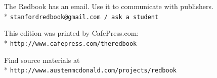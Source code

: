 \documentclass[10pt]{book}
\begin{document}
{\footnotesize
The Redbook has an email. Use it to communicate with publishers.\\*
\verb+stanfordredbook@gmail.com / ask a student+

This edition was printed by CafePress.com:\\*
\verb+http://www.cafepress.com/theredbook+

Find source materials at\\*
\verb+http://www.austenmcdonald.com/projects/redbook+}

\vfill\eject
\thispagestyle{empty}
\mbox{}
\vfill\eject
\thispagestyle{empty}
\mbox{}
\vfill\eject
\thispagestyle{empty}
\mbox{}
\vfill\eject
\thispagestyle{empty}
\mbox{}
\vfill\eject
\thispagestyle{empty}
\mbox{}
\vfill\eject
\thispagestyle{empty}
\mbox{}
\vfill\eject
\thispagestyle{empty}
\mbox{}
\vfill\eject
\thispagestyle{empty}
\mbox{}
\vfill\eject
\end{document}
